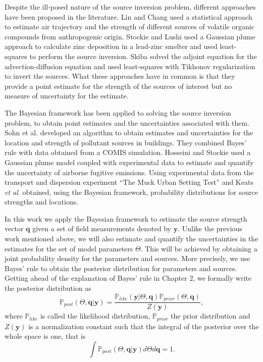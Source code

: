 \documentclass{sfuthesis}
\newcommand{\post}{\mathbb{P}_{post}}
\newcommand{\like}{\mathbb{P}_{like}}
\newcommand{\prior}{\mathbb{P}_{prior}}
\newcommand{\q}{\textbf{q}}
\newcommand{\y}{\textbf{y}}
\begin{document}
Despite the ill-posed nature of the source inversion problem, different
approaches have been proposed in the literature. Lin and Chang \cite{lin2002relative} used a statistical approach to estimate air
trajectory and 
the strength of different sources of volatile organic compounds
from anthropogenic origin. Stockie and Lushi \cite{lushi2010inverse} 
used a Gaussian plume approach to calculate
zinc deposition in a lead-zinc smelter and used  least-squares to perform the source inversion.
Skiba \cite{skiba2003method}  solved the adjoint equation
for the advection-diffusion equation and used least-squares 
with Tikhonov regularization to invert the sources. What
these approaches have in common is that they provide a point
estimate for the strength of the sources of interest but
no measure of uncertainty for the estimate.

The Bayesian  framework has been applied to solving the source inversion
problem, to obtain point estimates and the uncertainties associated 
with them. Sohn et al. \cite{sohn2002rapidly} developed an 
algorithm to obtain estimates and uncertainties for
the location and strength of pollutant sources in buildings.
They combined Bayes' rule with data obtained from a COMIS simulation. 
Hosseini and Stockie \cite{hosseini2016bayesian}
used a Gaussian plume model coupled with 
experimental data  to estimate
and quantify the uncertainty of airborne fugitive
emissions. Using
experimental data from the transport and dispersion 
experiment ``The Muck Urban Setting Test'' and Keats \textit{et al}. \cite{keats2007bayesian}
obtained, using the Bayesian framework, probability distributions for source strengths
and  locations. 

In this work we apply the Bayesian framework  to estimate the source 
strength vector $\q$
given a set of field measurements denoted by $\y$. Unlike
the previous work mentioned above, we will also  estimate and
quantify the uncertainties in the estimates for the set of model parameters $\Theta$.
This will be achieved by obtaining a joint probability
density for the parameters  and sources.  More precisely,
we use Bayes' rule to obtain the posterior distribution for parameters
and sources. 
Getting ahead of the explanation of Bayes' rule in Chapter 2, we formally write the posterior distribution  as
\begin{equation*}
\post(\Theta,\q|\y)=\frac{\like(\y|\Theta,\q)\prior(\Theta,\q)}{Z(\y)},
\end{equation*}
where $\like$ is called the likelihood distribution, $\prior$ the prior
distribution and $Z(\y)$ is a normalization constant such that the 
integral of the posterior over the whole space is one, that is
\begin{equation*}
\int\post(\Theta,\q|\y)d\Theta d\q=1.
\end{equation*}
\end{document}
